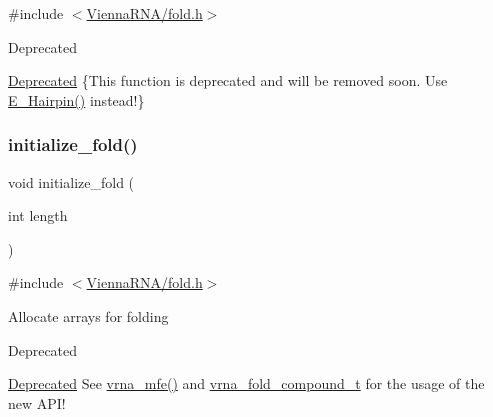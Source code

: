 {\ttfamily \#include $<$\mbox{\hyperlink{fold_8h}{Vienna\+R\+N\+A/fold.\+h}}$>$}

\begin{DoxyRefDesc}{Deprecated}
\item[\mbox{\hyperlink{deprecated__deprecated000077}{Deprecated}}]\{This function is deprecated and will be removed soon. Use \mbox{\hyperlink{group__eval__loops__hp_gadf943ee9a45b7f4cee9192c06210dace}{E\+\_\+\+Hairpin()}} instead!\} \end{DoxyRefDesc}
\mbox{\label{group__mfe__global__deprecated_gac3f0a28d9cb609d388b155445073fd20}} 
\subsubsection{\texorpdfstring{initialize\_fold()}{initialize\_fold()}}
{\footnotesize\ttfamily void initialize\+\_\+fold (\begin{DoxyParamCaption}\item[{int}]{length }\end{DoxyParamCaption})}



{\ttfamily \#include $<$\mbox{\hyperlink{fold_8h}{Vienna\+R\+N\+A/fold.\+h}}$>$}

Allocate arrays for folding~\newline
 \begin{DoxyRefDesc}{Deprecated}
\item[\mbox{\hyperlink{deprecated__deprecated000078}{Deprecated}}]See \mbox{\hyperlink{group__mfe__global_gabd3b147371ccf25c577f88bbbaf159fd}{vrna\+\_\+mfe()}} and \mbox{\hyperlink{group__fold__compound_ga1b0cef17fd40466cef5968eaeeff6166}{vrna\+\_\+fold\+\_\+compound\+\_\+t}} for the usage of the new A\+P\+I!\end{DoxyRefDesc}
\mbox{\label{group__mfe__global__deprecated_ga33c35bfd60df9d7a97aec72b887e6858}} 
